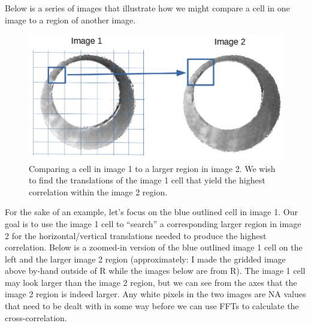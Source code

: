 \documentclass[]{book}
\begin{document}
Below is a series of images that illustrate how we might compare a cell in one image to a region of another image.

\begin{figure}

{\centering \includegraphics[width=0.5\linewidth]{images/cartridge_cases/im1_im2_cellComparison} 

}

\caption{Comparing a cell in image 1 to a larger region in image 2. We wish to find the translations of the image 1 cell that yield the highest correlation within the image 2 region.}\label{fig:unnamed-chunk-11}
\end{figure}

For the sake of an example, let's focus on the blue outlined cell in image 1. Our goal is to use the image 1 cell to ``search'' a corresponding larger region in image 2 for the horizontal/vertical translations needed to produce the highest correlation. Below is a zoomed-in version of the blue outlined image 1 cell on the left and the larger image 2 region (approximately: I made the gridded image above by-hand outside of R while the images below are from R). The image 1 cell may look larger than the image 2 region, but we can see from the axes that the image 2 region is indeed larger. Any white pixels in the two images are NA values that need to be dealt with in some way before we can use FFTs to calculate the cross-correlation.
\end{document}
